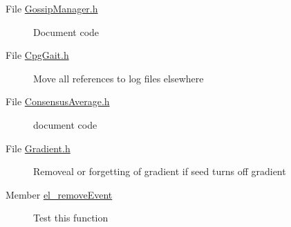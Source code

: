 \label{todo__todo000001}
\hypertarget{todo__todo000001}{}
 \begin{description}
\item[File \hyperlink{GossipManager_8h}{GossipManager.h} ]Document code \end{description}


\label{todo__todo000002}
\hypertarget{todo__todo000002}{}
 \begin{description}
\item[File \hyperlink{CpgGait_8h}{CpgGait.h} ]Move all references to log files elsewhere

\end{description}


\label{todo__todo000004}
\hypertarget{todo__todo000004}{}
 \begin{description}
\item[File \hyperlink{ConsensusAverage_8h}{ConsensusAverage.h} ]document code \end{description}


\label{todo__todo000005}
\hypertarget{todo__todo000005}{}
 \begin{description}
\item[File \hyperlink{Gradient_8h}{Gradient.h} ]Removeal or forgetting of gradient if seed turns off gradient \end{description}


\label{todo__todo000006}
\hypertarget{todo__todo000006}{}
 \begin{description}
\item[Member \hyperlink{EventListner_8h_49b8c52b3390c44cad9bf72cf3a51528}{el\_\-removeEvent} ]Test this function \end{description}
